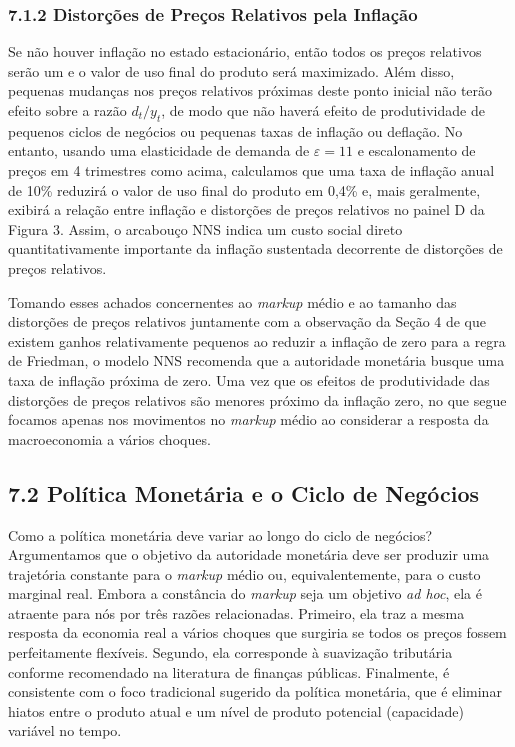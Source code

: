 \documentclass[12pt]{article}
\begin{document}
\subsubsection{7.1.2 Distorções de Preços Relativos pela Inflação} Se não houver inflação no estado estacionário, então todos os preços relativos serão um e o valor de uso final do produto será maximizado. Além disso, pequenas mudanças nos preços relativos próximas deste ponto inicial não terão efeito sobre a razão $d_t/y_t$, de modo que não haverá efeito de produtividade de pequenos ciclos de negócios ou pequenas taxas de inflação ou deflação. No entanto, usando uma elasticidade de demanda de $\varepsilon=11$ e escalonamento de preços em 4 trimestres como acima, calculamos que uma taxa de inflação anual de 10\% reduzirá o valor de uso final do produto em 0,4\% e, mais geralmente, exibirá a relação entre inflação e distorções de preços relativos no painel D da Figura 3. Assim, o arcabouço NNS indica um custo social direto quantitativamente importante da inflação sustentada decorrente de distorções de preços relativos.

Tomando esses achados concernentes ao \textit{markup} médio e ao tamanho das distorções de preços relativos juntamente com a observação da Seção 4 de que existem ganhos relativamente pequenos ao reduzir a inflação de zero para a regra de Friedman, o modelo NNS recomenda que a autoridade monetária busque uma taxa de inflação próxima de zero. Uma vez que os efeitos de produtividade das distorções de preços relativos são menores próximo da inflação zero, no que segue focamos apenas nos movimentos no \textit{markup} médio ao considerar a resposta da macroeconomia a vários choques.

\subsection{7.2 Política Monetária e o Ciclo de Negócios}

Como a política monetária deve variar ao longo do ciclo de negócios? Argumentamos que o objetivo da autoridade monetária deve ser produzir uma trajetória constante para o \textit{markup} médio ou, equivalentemente, para o custo marginal real. Embora a constância do \textit{markup} seja um objetivo \textit{ad hoc}, ela é atraente para nós por três razões relacionadas. Primeiro, ela traz a mesma resposta da economia real a vários choques que surgiria se todos os preços fossem perfeitamente flexíveis. Segundo, ela corresponde à suavização tributária conforme recomendado na literatura de finanças públicas. Finalmente, é consistente com o foco tradicional sugerido da política monetária, que é eliminar hiatos entre o produto atual e um nível de produto potencial (capacidade) variável no tempo.
\end{document}
